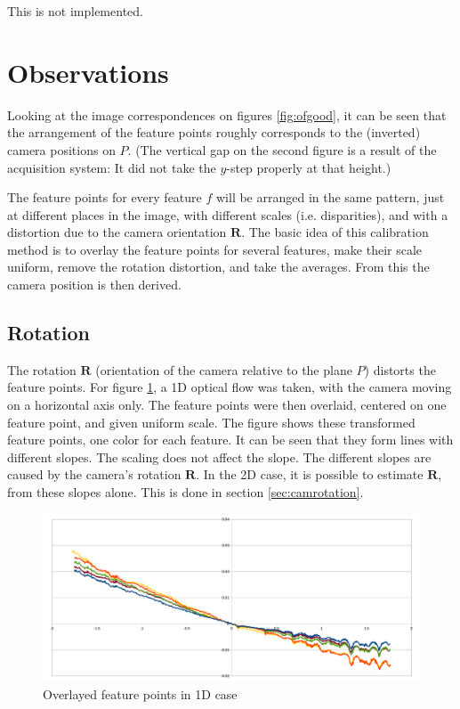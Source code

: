 \documentclass[11pt]{scrreprt}
\newcommand{\matr}[1]{\mathbf{#1}}
\begin{document}
This is not implemented.


\pagebreak
\section{Observations}
Looking at the image correspondences on figures \ref{fig:ofgood}, it can be seen that the arrangement of the feature points roughly corresponds to the (inverted) camera positions on $P$. (The vertical gap on the second figure is a result of the acquisition system: It did not take the $y$-step properly at that height.) 

The feature points for every feature $f$ will be arranged in the same pattern, just at different places in the image, with different scales (i.e. disparities), and with a distortion due to the camera orientation $\matr{R}$. The basic idea of this calibration method is to overlay the feature points for several features, make their scale uniform, remove the rotation distortion, and take the averages. From this the camera position is then derived.


\subsection{Rotation}
The rotation $\matr{R}$ (orientation of the camera relative to the plane $P$) distorts the feature points. For figure \ref{fig:onedimslopes}, a 1D optical flow was taken, with the camera moving on a horizontal axis only. The feature points were then overlaid, centered on one feature point, and given uniform scale. The figure shows these transformed feature points, one color for each feature. It can be seen that they form lines with different slopes. The scaling does not affect the slope. The different slopes are caused by the camera's rotation $\matr{R}$. In the 2D case, it is possible to estimate $\matr{R}$, from these slopes alone. This is done in section \ref{sec:camrotation}.

\begin{figure}[h]
\centering
\includegraphics[width=\textwidth]{onedimslopes.pdf}
\caption{Overlayed feature points in 1D case}
\label{fig:onedimslopes}
\end{figure}
\end{document}
